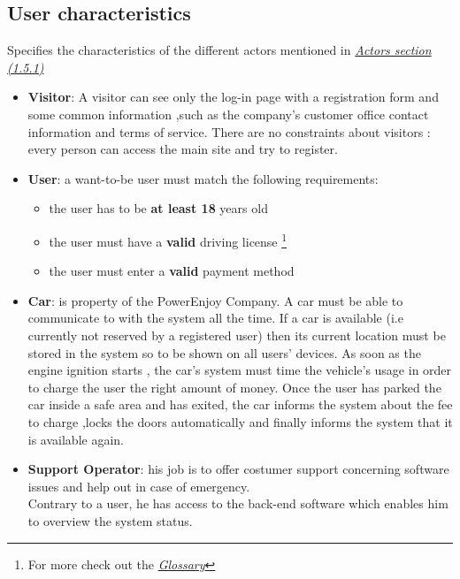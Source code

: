 \documentclass[12pt]{article}
\begin{document}
	\subsection{User characteristics}
		Specifies the characteristics of the different actors mentioned in \hyperref[actors:3]	
		{\textit{Actors section (1.5.1)}} 
	\begin{itemize}
		\item \textbf{Visitor}: A visitor can see only the log-in page with a registration form 
	     	  and some common information ,such as the company's customer office contact 
	     	  information and terms of service. There are no constraints about visitors : every 
	     	  person can access the main site and try to register.
		\item \textbf{User}: a want-to-be user must match the following requirements:
		\begin{itemize}
				\item the user has to be \textbf{at least 18} years old
				\item the user must have a \textbf{valid} driving license \footnote{\label{note1} For 
			    more check out the \hyperref[actors:3]{\textit{Glossary}}}
				\item the user must enter a \textbf{valid} payment method 
	    \end{itemize}
		\item \textbf{Car}: is property of the PowerEnjoy Company. A car must be able to 		
				communicate to with the system all the time. If a car is available (i.e 		
				currently not reserved by a registered user) then its current location must be 
				stored in the system so to be shown on all users' devices. As soon as the 
				engine ignition starts , the car's system must time the vehicle's usage in 
				order to charge the user the right amount of money. Once the user has parked 
				the car inside a safe area and has exited, the car informs the system about 
				the fee to charge ,locks the doors automatically and finally informs the 
				system that it is available again.
		\item \textbf{Support Operator}: his job is to offer costumer support concerning 
				software issues and help out in case of emergency.\\ Contrary to a user, he 
				has access to the back-end software which enables him to overview the system 
				status.
	\end{itemize}
	
	
\end{document}
